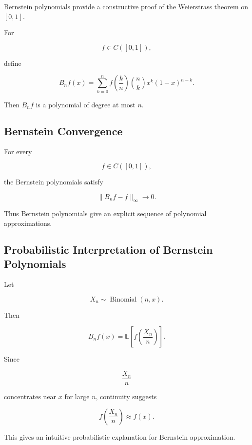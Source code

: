 Bernstein polynomials provide a constructive proof of the Weierstrass
theorem on \([0,1]\).

For

\[
f\in C([0,1]),
\]

define

\[
\boxed{
B_nf(x)
=
\sum_{k=0}^{n}
f\left(\frac{k}{n}\right)
\binom{n}{k}
x^k(1-x)^{n-k}.
}
\]

Then \(B_nf\) is a polynomial of degree at most \(n\).

\subsection{Bernstein Convergence}
\label{subsec:bernstein-convergence}

\begin{theorem}
For every

\[
f\in C([0,1]),
\]

the Bernstein polynomials satisfy

\[
\boxed{
\|B_nf-f\|_\infty\to0.
}
\]
\end{theorem}

Thus Bernstein polynomials give an explicit sequence of polynomial
approximations.

\subsection{Probabilistic Interpretation of Bernstein Polynomials}
\label{subsec:bernstein-probabilistic}

Let

\[
X_n
\sim
\operatorname{Binomial}(n,x).
\]

Then

\[
\boxed{
B_nf(x)
=
\mathbb{E}
\left[
f\left(\frac{X_n}{n}\right)
\right].
}
\]

Since

\[
\frac{X_n}{n}
\]

concentrates near \(x\) for large \(n\), continuity suggests

\[
f\left(\frac{X_n}{n}\right)
\approx
f(x).
\]

This gives an intuitive probabilistic explanation for Bernstein
approximation.

